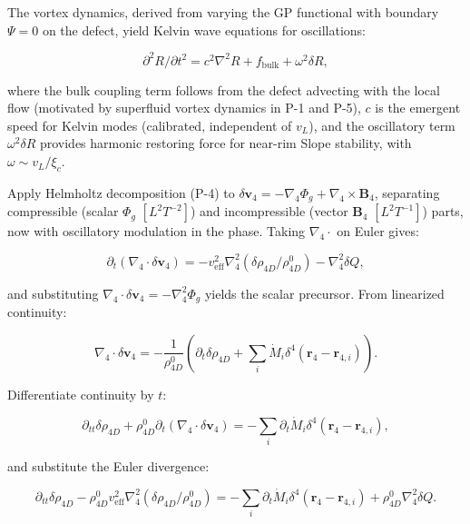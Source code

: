 The vortex dynamics, derived from varying the GP functional with boundary $\Psi=0$ on the defect, yield Kelvin wave equations for oscillations:

\begin{equation}
\partial^2 R / \partial t^2 = c^2 \nabla^2 R + f_{\text{bulk}} + \omega^2 \delta R,
\end{equation}

where the bulk coupling term follows from the defect advecting with the local flow (motivated by superfluid vortex dynamics in P-1 and P-5), $c$ is the emergent speed for Kelvin modes (calibrated, independent of $v_L$), and the oscillatory term $\omega^2 \delta R$ provides harmonic restoring force for near-rim Slope stability, with $\omega \sim v_L / \xi_c$.

Apply Helmholtz decomposition (P-4) to $\delta \mathbf{v}_4 = -\nabla_4 \Phi_g + \nabla_4 \times \mathbf{B}_4$, separating compressible (scalar $\Phi_g$ $[L^2 T^{-2}]$) and incompressible (vector $\mathbf{B}_4$ $[L^2 T^{-1}]$) parts, now with oscillatory modulation in the phase. Taking $\nabla_4 \cdot$ on Euler gives:

\begin{equation}
\partial_t (\nabla_4 \cdot \delta \mathbf{v}_4) = -v_{\text{eff}}^2 \nabla_4^2 (\delta \rho_{4D} / \rho_{4D}^0) - \nabla_4^2 \delta Q,
\end{equation}

and substituting $\nabla_4 \cdot \delta \mathbf{v}_4 = -\nabla_4^2 \Phi_g$ yields the scalar precursor. From linearized continuity:

\begin{equation}
\nabla_4 \cdot \delta \mathbf{v}_4 = -\frac{1}{\rho_{4D}^0} \left( \partial_t \delta \rho_{4D} + \sum_i \dot{M}_i \delta^4(\mathbf{r}_4 - \mathbf{r}_{4,i}) \right).
\end{equation}

Differentiate continuity by $t$:

\begin{equation}
\partial_{tt} \delta \rho_{4D} + \rho_{4D}^0 \partial_t (\nabla_4 \cdot \delta \mathbf{v}_4) = -\sum_i \partial_t \dot{M}_i \delta^4(\mathbf{r}_4 - \mathbf{r}_{4,i}),
\end{equation}

and substitute the Euler divergence:

\begin{equation}
\partial_{tt} \delta \rho_{4D} - \rho_{4D}^0 v_{\text{eff}}^2 \nabla_4^2 (\delta \rho_{4D} / \rho_{4D}^0) = -\sum_i \partial_t \dot{M}_i \delta^4(\mathbf{r}_4 - \mathbf{r}_{4,i}) + \rho_{4D}^0 \nabla_4^2 \delta Q.
\end{equation}

